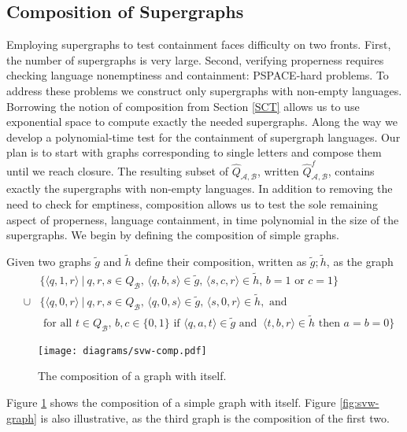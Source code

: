 \documentclass{LMCS}
\newcommand{\zug}[1]{\langle #1  \rangle}
\newcommand{\A}{{\mathcal A}}
\newcommand{\B}{{\mathcal B}}
\renewcommand{\graph}{\widetilde}
\newcommand{\superg}{\widehat}
\begin{document}
\subsection{Composition of Supergraphs}

Employing supergraphs to test containment faces difficulty on two fronts. First, the number of
supergraphs is very large. Second, verifying properness requires checking language nonemptiness and
containment: PSPACE-hard problems. To address these problems we construct only
supergraphs with non-empty languages.  Borrowing the notion of composition from Section \ref{SCT}
allows us to use exponential space to compute exactly the needed supergraphs. Along the way we
develop a polynomial-time test for the containment of supergraph languages.  Our plan is to start
with graphs corresponding to single letters and compose them until we reach closure. The resulting
subset of $\superg{Q}_{\A,\B}$, written $\superg{Q}_{\A,\B}^f$, contains exactly the supergraphs
with non-empty languages. In addition to removing the need to check for emptiness, composition
allows us to test the sole remaining aspect of properness, language containment, in time polynomial
in the size of the supergraphs.  We begin by defining the composition of simple graphs.

\begin{defi}
Given two graphs $\graph{g}$ and $\graph{h}$ define their
composition, written as $\graph{g};\graph{h}$, as the graph  
\begin{eqnarray*}
&&\{\zug{q,1,r}~|~q,r,s \in Q_\B,\,\zug{q,b,s} \in \graph{g},\,\zug{s,c,r} \in
\graph{h},\,b=1\text{ or }c=1\}\\
&\cup& \{\zug{q,0,r}~|~q,r,s \in Q_\B,\,\zug{q,0,s} \in \graph{g},\,\zug{s,0,r} \in
\graph{h},\text{ and}\\
&&\text{ for all } t \in Q_\B,\, b,c \in \{0,1\} \text{ if } \zug{q,a,t} \in
\graph{g} \text{ and }~ \zug{t,b,r} \in \graph{h}\text{ then }a=b=0\}
\end{eqnarray*}
\end{defi}

\begin{figure}[t]
\begin{center}
{\texttt{[image: diagrams/svw-comp.pdf]}}
\end{center}
\caption{The composition of a graph with itself.}\label{fig:svw-comp}
\end{figure}

\begin{exa}
Figure \ref{fig:svw-comp} shows the composition of a simple graph with itself.
Figure \ref{fig:svw-graph} is also illustrative, as the third graph is
the composition of the first two.
\end{exa}
\end{document}
